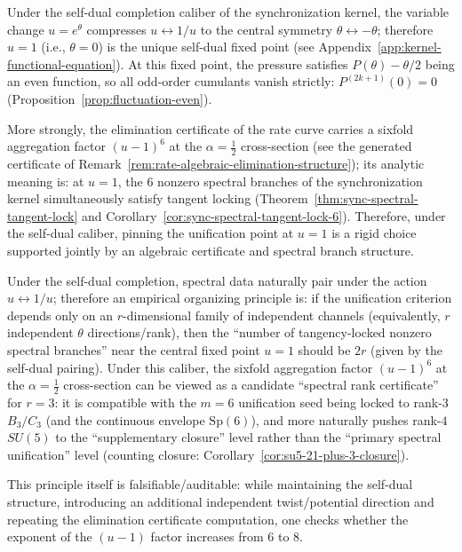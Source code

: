 \begin{remark}[Symmetric fixedness at the self-dual point \(u=1\) and six-branch locking]\label{rem:selfdual-u1-six-branch-lock}
Under the self-dual completion caliber of the synchronization kernel, the variable change \(u=e^{\theta}\) compresses \(u\leftrightarrow 1/u\) to the central symmetry \(\theta\leftrightarrow -\theta\);
therefore \(u=1\) (i.e., \(\theta=0\)) is the unique self-dual fixed point (see Appendix~\ref{app:kernel-functional-equation}).
At this fixed point, the pressure satisfies \(P(\theta)-\theta/2\) being an even function, so all odd-order cumulants vanish strictly:
\(
P^{(2k+1)}(0)=0
\)
(Proposition~\ref{prop:fluctuation-even}).
\par
More strongly, the elimination certificate of the rate curve carries a sixfold aggregation factor \((u-1)^6\) at the \(\alpha=\tfrac12\) cross-section
(see the generated certificate of Remark~\ref{rem:rate-algebraic-elimination-structure}); its analytic meaning is:
at \(u=1\), the \(6\) nonzero spectral branches of the synchronization kernel simultaneously satisfy tangent locking (Theorem~\ref{thm:sync-spectral-tangent-lock} and Corollary~\ref{cor:sync-spectral-tangent-lock-6}).
Therefore, under the self-dual caliber, pinning the unification point at \(u=1\) is a rigid choice supported jointly by an algebraic certificate and spectral branch structure.
\end{remark}

\begin{remark}\label{rem:u1-six-branch-rank3-certificate}
Under the self-dual completion, spectral data naturally pair under the action \(u\leftrightarrow 1/u\);
therefore an empirical organizing principle is: if the unification criterion depends only on an \(r\)-dimensional family of independent channels (equivalently, \(r\) independent \(\theta\) directions/rank),
then the ``number of tangency-locked nonzero spectral branches'' near the central fixed point \(u=1\) should be \(2r\) (given by the self-dual pairing).
Under this caliber, the sixfold aggregation factor \((u-1)^6\) at the \(\alpha=\tfrac12\) cross-section can be viewed as a candidate ``spectral rank certificate'' for \(r=3\):
it is compatible with the \(m=6\) unification seed being locked to rank-\(3\) \(B_3/C_3\) (and the continuous envelope \(\mathrm{Sp}(6)\)),
and more naturally pushes rank-\(4\) \(SU(5)\) to the ``supplementary closure'' level rather than the ``primary spectral unification'' level (counting closure: Corollary~\ref{cor:su5-21-plus-3-closure}).
\par
This principle itself is falsifiable/auditable: while maintaining the self-dual structure, introducing an additional independent twist/potential direction
and repeating the elimination certificate computation, one checks whether the exponent of the \((u-1)\) factor increases from \(6\) to \(8\).
\end{remark}

